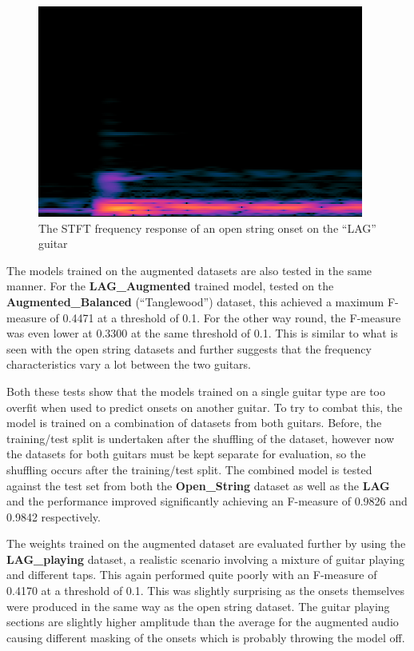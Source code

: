 \documentclass[conference]{IEEEtran}
\begin{document}
\begin{figure}[htbp]
    \centerline{\includegraphics[scale=0.4]{LAG-bridge.png}}
    \caption{The STFT frequency response of an open string onset on the ``LAG'' guitar}
    \label{LAG-bridge}
    \end{figure}
    
The models trained on the augmented datasets are also tested in the same manner. For the \textbf{LAG\_Augmented} trained model, tested on the \textbf{Augmented\_Balanced} (``Tanglewood'') dataset, this achieved a maximum F-measure of 0.4471 at a threshold of 0.1. For the other way round, the F-measure was even lower at 0.3300 at the same threshold of 0.1. This is similar to what is seen with the open string datasets
and further suggests that the frequency characteristics vary a lot between the two guitars.

Both these tests show that the models trained on a single guitar type are too overfit when used to predict onsets on another guitar. To try to combat this, the model is trained on a combination of datasets from both guitars. Before, the training/test split is undertaken after the shuffling of the dataset,
however now the datasets for both guitars must be kept separate for evaluation, so the shuffling occurs after the training/test split. The combined model is tested against the test set from both the \textbf{Open\_String} dataset as well as the \textbf{LAG} and the performance improved significantly achieving 
an F-measure of 0.9826 and 0.9842 respectively.

The weights trained on the augmented dataset are evaluated further by using the \textbf{LAG\_playing} dataset, a realistic scenario involving a mixture of guitar playing and different taps. This again performed quite poorly with an F-measure of 0.4170 at a threshold of 0.1. This was slightly surprising as the onsets themselves
were produced in the same way as the open string dataset. The guitar playing sections are slightly higher amplitude than the average for the augmented audio causing different masking of the onsets which is probably throwing the model off.
\end{document}

